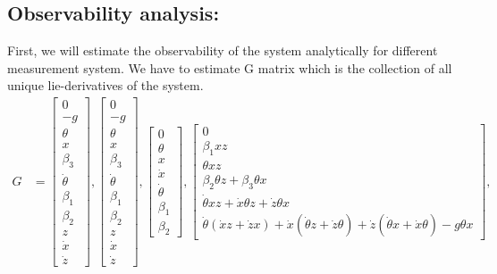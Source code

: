 \documentclass[12pt]{article}
\begin{document}
\subsection*{Observability analysis:}
First, we will estimate the observability of the system analytically for different measurement system. We have to estimate G matrix which is the collection of all unique lie-derivatives of the system. 
\begin{align*}
    G &= \left[\begin{matrix}0\\- g\\\theta\\x\\\beta_{3}\\\dot{\theta}\\\beta_{1}\\\beta_{2}\\z\\\dot{x}\\\dot{z}\end{matrix}\right], 
    \left[\begin{matrix}0\\- g\\\theta\\x\\\beta_{3}\\\dot{\theta}\\\beta_{1}\\\beta_{2}\\z\\\dot{x}\\\dot{z}\end{matrix}\right], 
    \left[\begin{matrix}0\\\theta\\x\\\dot{x}\\\dot{\theta}\\\beta_{1}\\\beta_{2}\end{matrix}\right], 
    \left[\begin{matrix}0\\\beta_{1} x z\\\theta x z\\\beta_{2} \theta z + \beta_{3} \theta x\\\dot{\theta} x z + \dot{x} \theta z + \dot{z} \theta x\\\dot{\theta} \left(\dot{x} z + \dot{z} x\right) + \dot{x} \left(\dot{\theta} z + \dot{z} \theta\right) + \dot{z} \left(\dot{\theta} x + \dot{x} \theta\right) - g \theta x\end{matrix}\right],

\end{align*}
\end{document}

